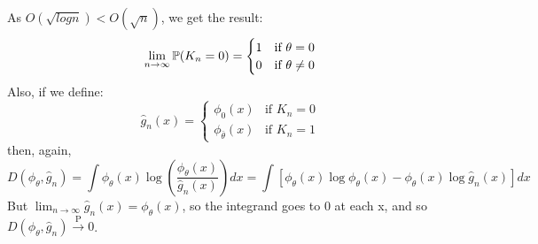 As \(O(\sqrt{log n}) < O(\sqrt{n})\), we get the result:
\[
\lim_{n \rightarrow \infty} \operatorname{\mathbb{P}}(K_{n} = 0) = \begin{cases}
1 & \text{if } \theta = 0 \\
0 & \text{if } \theta \neq 0
\end{cases}
\]
Also, if we define:
\[
\hat{g}_{n}(x) = 
\begin{cases}
\phi_{0}(x) & \text{if } K_{n} = 0 \\
\phi_{\bar{\theta}}(x) & \text{if } K_{n} = 1
\end{cases}
\]
then, again,
\[
D(\phi_\theta, \hat{g}_{n}) = \int \phi_\theta(x) \log \left(\frac{\phi_\theta(x)}{\hat{g}_{n}(x)} \right) dx = \int \left[\phi_\theta(x) \log \phi_\theta(x) - \phi_\theta(x) \log \hat{g}_{n}(x) \right] dx
\]
But \(\lim_{n \rightarrow \infty} \hat{g}_{n}(x) = \phi_\theta(x)\), so
the integrand goes to 0 at each x, and so
\(D(\phi_\theta, \hat{g}_{n}) \xrightarrow{\textrm{P}} 0\).
